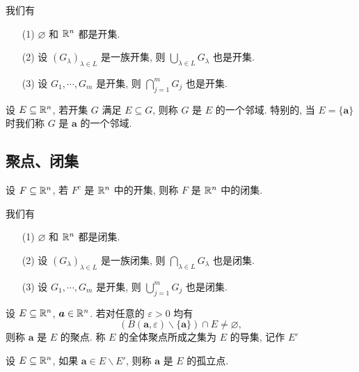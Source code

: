 \begin{proposition}
	我们有
	\begin{itemize}[leftmargin=1.5cm,itemindent=0cm]
		\item[(1)] $\varnothing$ 和 $\mathbb {R}^{n}$ 都是开集.
		\item[(2)] 设 $(G_\lambda)_{\lambda\in L}$ 是一族开集, 则 $\bigcup\limits_{\lambda\in L} G_\lambda$ 也是开集.
		\item[(3)] 设 $G_1,\cdots,G_m$ 是开集, 则 $\bigcap\limits_{j=1}^m G_j$ 也是开集.
	\end{itemize}
\end{proposition}

\begin{definition}[邻域]
	设 $E\subseteq \mathbb {R}^{n}$, 若开集 $G$ 满足 $E \subseteq G$, 则称 $G$ 是 $E$ 的一个邻域. 特别的, 当 $E=\{\bm a\}$ 时我们称 $G$ 是 $\bm a$ 的一个邻域.
\end{definition}

\subsection{聚点、闭集}
\begin{definition}[闭集]
	设 $F \subseteq \mathbb {R}^{n}$, 若 $F^c$ 是 $\mathbb {R}^{n}$ 中的开集, 则称 $F$ 是 $\mathbb {R}^{n}$ 中的闭集.
\end{definition}

\begin{proposition}
	我们有
	\begin{itemize}[leftmargin=1.5cm,itemindent=0cm]
		\item[(1)] $\varnothing$ 和 $\mathbb {R}^{n}$ 都是闭集.
		\item[(2)] 设 $(G_\lambda)_{\lambda\in L}$ 是一族闭集, 则 $\bigcap\limits_{\lambda\in L} G_\lambda$ 也是闭集.
		\item[(3)] 设 $G_1,\cdots,G_m$ 是开集, 则 $\bigcup\limits_{j=1}^m G_j$ 也是闭集.
	\end{itemize}
\end{proposition}

\begin{definition}[聚点、导集]
	设 $E\subseteq \mathbb {R}^{n}$, $\bm a \in \mathbb {R}^{n}$. 若对任意的 $\varepsilon>0$ 均有
	$$(B(\bm a,\varepsilon)\backslash\{\bm a\}) \cap E \neq \varnothing,$$
	则称 $\bm a$ 是 $E$ 的聚点. 称 $E$ 的全体聚点所成之集为 $E$ 的导集, 记作 $E'$
\end{definition}

\begin{definition}[孤立点]
	设 $E \subseteq \mathbb {R}^{n}$, 如果 $\bm a \in E\backslash E'$, 则称 $\bm a$ 是 $E$ 的孤立点.
\end{definition}

